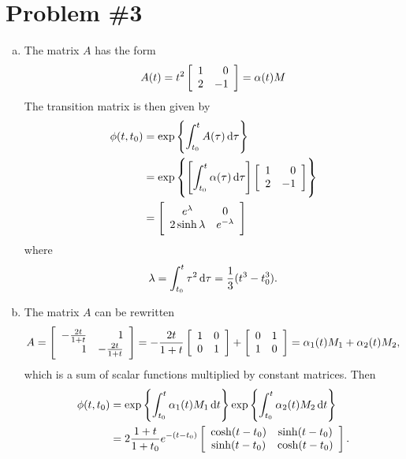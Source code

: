 \documentclass{article}
\begin{document}
\pagebreak

\section*{Problem \#3}
\begin{enumerate}[(a)]
  \item{
    The matrix $A$ has the form
    $$
      A(t)
    = t^2
      \left[\begin{array}{r r}
        1 &  0 \\
        2 & -1
      \end{array}\right]
    = \alpha(t) M
    $$
    The transition matrix is then given by
    \begin{align*}
         \phi(t, t_0)
      &= \exp\left\{
           \int_{t_0}^{t} A(\tau) \dif\tau
         \right\} \\
      &= \exp\left\{
           \left[
             \int_{t_0}^t \alpha(\tau) \dif\tau
           \right]
           \left[\begin{array}{r r}
             1 &  0 \\
             2 & -1
           \end{array}\right]
         \right\} \\
      &= \left[\begin{array}{c c}
           e^\lambda         & 0 \\
           2 \sinh \lambda & e^{-\lambda}
         \end{array}\right]
    \end{align*}
    where
    $$
      \lambda
    = \int_{t_0}^{t} \tau^2 \dif\tau
    = \frac{1}{3}(t^3 - t_0^3).
    $$
  }
  \item{
    The matrix $A$ can be rewritten
    $$
    A
    =
    \left[\begin{array}{r r}
      -\frac{2t}{1 + t} & 1                 \\
       1                & -\frac{2t}{1 + t}
    \end{array}\right]
    =
    -\frac{2t}{1 + t}
    \left[\begin{array}{r r}
       1 & 0 \\
       0 & 1
    \end{array}\right]
    +
    \left[\begin{array}{r r}
       0 & 1 \\
       1 & 0
    \end{array}\right]
    =
    \alpha_1(t) M_1 + \alpha_2(t) M_2,
    $$
    which is a sum of scalar functions multiplied by constant
    matrices. Then
    \begin{align*}
    \phi(t, t_0)
    &=
    \exp \left\{
      \int_{t_0}^{t} \alpha_1(t) M_1 \dif t
    \right\}
    \exp \left\{
      \int_{t_0}^{t} \alpha_2(t) M_2 \dif t
    \right\} \\
    &=
    2\frac{1 + t}{1 + t_0}e^{-(t - t_0)}
    \left[\begin{array}{c c}
       \cosh (t - t_0) & \sinh (t - t_0) \\
       \sinh (t - t_0) & \cosh (t - t_0)
    \end{array}\right].
    \end{align*}
  }
\end{enumerate}
\end{document}
